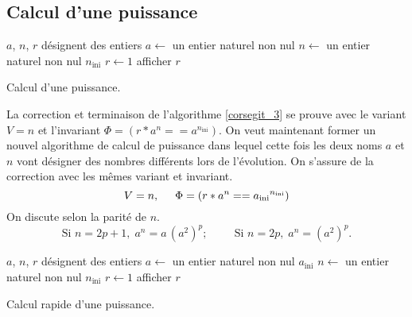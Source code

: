 \subsection{Calcul d'une puissance}
\begin{algorithm}
  $a$, $n$, $r$ désignent des entiers\;
  $a\longleftarrow$ un entier naturel non nul\;
  $n\longleftarrow$ un entier naturel non nul $n_{\text{ini}}$\;
  $r\longleftarrow 1$\;
  afficher $r$\;
  \caption{Calcul d'une puissance.}
  \label{corsegit_3}
\end{algorithm}
La correction et  terminaison de l'algorithme \ref{corsegit_3} se prouve avec le variant $V = n$ et l'invariant $\Phi = \left( r * a^n == a^{n_{\text{ini}}}\right) $.\newline
On veut maintenant former un nouvel algorithme de calcul de puissance dans lequel cette fois les deux noms $a$ et $n$ vont désigner des nombres différents lors de l'évolution.\newline
On s'assure de la correction avec les mêmes variant et invariant.
\[
 V = n, \hspace{0.5cm} \Phi = \left( r * a^n == {a_{\text{ini}}}^{n_{\text{ini}}}\right)
\]
On discute selon la parité de $n$.
\[
 \text{Si } n = 2p + 1,\; a^n = a \,(a^2)^p ; \hspace{1cm} \text{Si } n = 2p,\; a^n = (a^2)^p.
\]

\begin{algorithm}
  $a$, $n$, $r$ désignent des entiers\;
  $a\longleftarrow$ un entier naturel non nul $a_{\text{ini}}$\;
  $n\longleftarrow$ un entier naturel non nul $n_{\text{ini}}$\;
  $r\longleftarrow 1$\;
  afficher $r$\;
  \caption{Calcul rapide d'une puissance.}
  \label{corsegit_7}
\end{algorithm}


